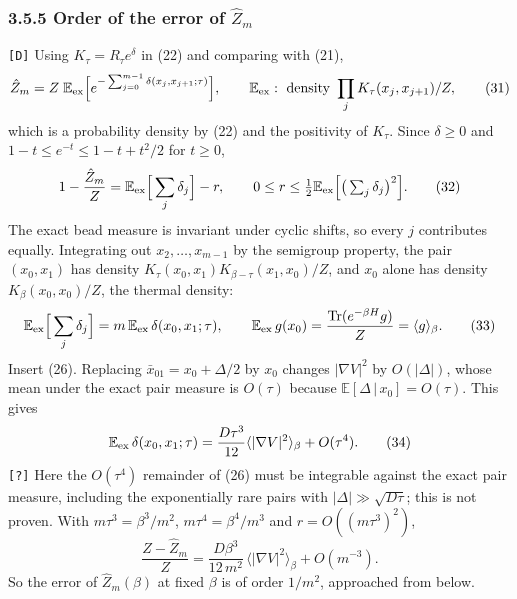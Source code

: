 \documentclass[11pt,a4paper]{article}
\begin{document}
\hypertarget{order-of-the-error-of-hat-z_m}{%
\subsubsection{\texorpdfstring{3.5.5 Order of the error of \(\hat Z_m\)}{3.5.5 Order of the error of \textbackslash hat Z\_m}}\label{order-of-the-error-of-hat-z_m}}

\texttt{[D]} Using \(K_\tau=R_\tau e^{\delta}\) in (22) and comparing with (21),
\[\hat Z_m=Z\;\mathbb E_{\rm ex}\Big[e^{-\sum_{j=0}^{m-1}\delta(x_j,x_{j+1};\tau)}\Big],\qquad \mathbb E_{\rm ex}:\ \text{density }\prod_jK_\tau(x_j,x_{j+1})/Z,\tag{31}\]
which is a probability density by (22) and the positivity of \(K_\tau\). Since \(\delta\ge0\) and \(1-t\le e^{-t}\le1-t+t^2/2\) for \(t\ge0\),
\[1-\frac{\hat Z_m}{Z}=\mathbb E_{\rm ex}\Big[\sum_j\delta_j\Big]-r,\qquad0\le r\le\tfrac12\mathbb E_{\rm ex}\Big[\big(\textstyle\sum_j\delta_j\big)^2\Big].\tag{32}\]
The exact bead measure is invariant under cyclic shifts, so every \(j\) contributes equally. Integrating out \(x_2,\dots,x_{m-1}\) by the semigroup property, the pair \((x_0,x_1)\) has density \(K_\tau(x_0,x_1)K_{\beta-\tau}(x_1,x_0)/Z\), and \(x_0\) alone has density \(K_\beta(x_0,x_0)/Z\), the thermal density:
\[\mathbb E_{\rm ex}\Big[\sum_j\delta_j\Big]=m\,\mathbb E_{\rm ex}\,\delta(x_0,x_1;\tau),\qquad \mathbb E_{\rm ex}\,g(x_0)=\frac{\operatorname{Tr}(e^{-\beta H}g)}{Z}=\langle g\rangle_\beta.\tag{33}\]
Insert (26). Replacing \(\bar x_{01}=x_0+\Delta/2\) by \(x_0\) changes \(|\nabla V|^2\) by \(O(|\Delta|)\), whose mean under the exact pair measure is \(O(\tau)\) because \(\mathbb E[\Delta\,|\,x_0]=O(\tau)\). This gives
\[\mathbb E_{\rm ex}\,\delta(x_0,x_1;\tau)=\frac{D\tau^3}{12}\langle|\nabla V|^2\rangle_\beta+O(\tau^4).\tag{34}\]
\texttt{[?]} Here the \(O(\tau^4)\) remainder of (26) must be integrable against the exact pair measure, including the exponentially rare pairs with \(|\Delta|\gg\sqrt{D\tau}\); this is not proven. With \(m\tau^3=\beta^3/m^2\), \(m\tau^4=\beta^4/m^3\) and \(r=O((m\tau^3)^2)\),
\[\frac{Z-\hat Z_m}{Z}=\frac{D\beta^3}{12\,m^2}\,\langle|\nabla V|^2\rangle_\beta+O(m^{-3}).\tag{35}\]
So the error of \(\hat Z_m(\beta)\) at fixed \(\beta\) is of order \(1/m^2\), approached from below.
\end{document}
